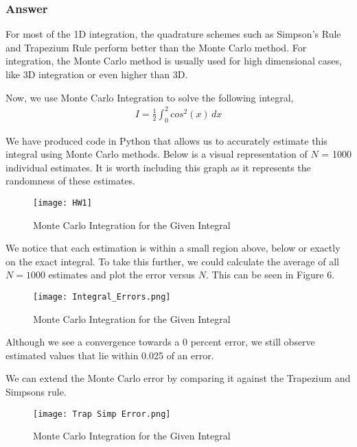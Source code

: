 \documentclass[12pt]{article}
\begin{document}
\subsubsection*{Answer}

For most of the 1D integration, the quadrature schemes such as Simpson's Rule and Trapezium Rule perform better than the Monte Carlo method. For integration, the Monte Carlo method is usually used for high dimensional cases, like 3D integration or even higher than 3D. \par

Now, we use Monte Carlo Integration to solve the following integral,
\begin{align}
I = \frac{1}{2}\int_{0}^{2} cos^2(x) \,dx
\end{align}

We have produced code in Python that allows us to accurately estimate this integral using Monte Carlo methods. Below is a visual representation of $N$ = 1000 individual estimates. It is worth including this graph as it represents the randomness of these estimates. 
 
\begin{figure}[h!]
  \texttt{[image: HW1]}
  \caption{Monte Carlo Integration for the Given Integral}
  \label{fig:mc_randomness}
\end{figure}


We notice that each estimation is within a small region above, below or exactly on the exact integral. To take this further, we could calculate the average of all $N = 1000$ estimates and plot the error versus $N$. This can be seen in Figure 6.

\begin{figure}[h!]
  \texttt{[image: Integral\_Errors.png]}
  \caption{Monte Carlo Integration for the Given Integral}
  \label{fig:mc_randomness}
\end{figure}

Although we see a convergence towards a 0 percent error, we still observe estimated values that lie within 0.025 of an error. 

We can extend the Monte Carlo error by comparing it against the Trapezium and Simpsons rule. 

\begin{figure}[h!]
  \texttt{[image: Trap Simp Error.png]}
  \caption{Monte Carlo Integration for the Given Integral}
  \label{fig:mc_randomness}
\end{figure}
\end{document}
